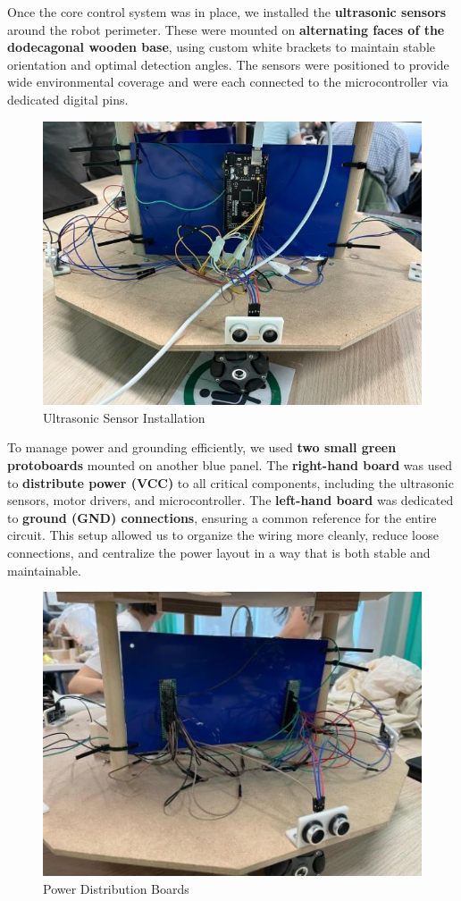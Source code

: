 Once the core control system was in place, we installed the \textbf{ultrasonic sensors} around the robot perimeter. These were mounted on \textbf{alternating faces of the dodecagonal wooden base}, using custom white brackets to maintain stable orientation and optimal detection angles. The sensors were positioned to provide wide environmental coverage and were each connected to the microcontroller via dedicated digital pins.

\begin{figure}[H]
    \centering
    \includegraphics[width=0.6\linewidth]{../ReportMovementModule/images/Aspose.Words.728084da-df58-4b9d-a372-f65cffbdb23d.013.jpeg}
    \caption{Ultrasonic Sensor Installation}
\end{figure}

To manage power and grounding efficiently, we used \textbf{two small green protoboards} mounted on another blue panel. The \textbf{right-hand board} was used to \textbf{distribute power (VCC)} to all critical components, including the ultrasonic sensors, motor drivers, and microcontroller. The \textbf{left-hand board} was dedicated to \textbf{ground (GND) connections}, ensuring a common reference for the entire circuit. This setup allowed us to organize the wiring more cleanly, reduce loose connections, and centralize the power layout in a way that is both stable and maintainable.

\begin{figure}[H]
    \centering
    \includegraphics[width=0.6\linewidth]{../ReportMovementModule/images/Aspose.Words.728084da-df58-4b9d-a372-f65cffbdb23d.014.jpeg}
    \caption{Power Distribution Boards}
\end{figure}

